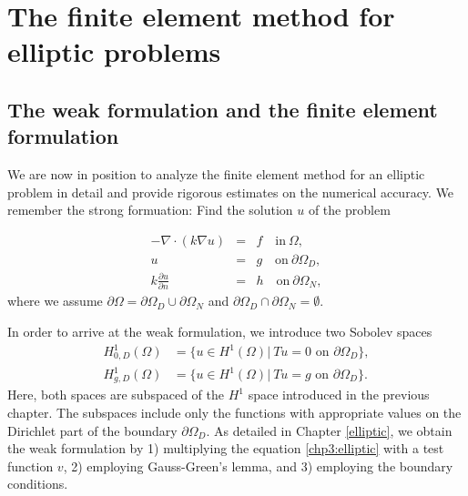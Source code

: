 \chapter{The finite element method for elliptic problems}

\section{The weak formulation and the finite element formulation}

We are now in position to analyze the finite element method
for an elliptic problem in detail and provide rigorous estimates
on the numerical accuracy. We remember the strong formuation:  
Find the solution $u$ of the problem

\begin{eqnarray}
\label{chp3:elliptic}
-\nabla\cdot(k\nabla u)  &=& f \quad \textrm{in}\ \Omega,\\
\label{chp3:Dirichlet}
u&=& g \quad \textrm{on}\ \partial\Omega_D, \\
\label{chp3:Neumann}
k \frac{\partial u}{\partial n}&=& h \quad \textrm{on}\ \partial\Omega_N , 
\end{eqnarray}
where we assume $\partial \Omega = \partial \Omega_D \cup \partial \Omega_N$ 
and $\partial \Omega_D \cap \partial \Omega_N = \emptyset$.

In order to arrive at the weak formulation, we introduce two Sobolev spaces
\begin{align}
H^1_{0, D} (\Omega) &= \{ u \in H^1(\Omega)  | \  T u = 0 \mbox{ on } \partial \Omega_D \}, \\   
H^1_{g, D} (\Omega) &= \{ u \in H^1(\Omega)  | \  T u = g \mbox{ on } \partial \Omega_D \}  .  
\end{align}
Here, both spaces are subspaced of the $H^1$ space introduced in the previous chapter. The 
subspaces include only the functions with appropriate values on the Dirichlet part of the boundary $\partial \Omega_D$.  
As detailed in Chapter \ref{elliptic}, we obtain the weak formulation by 1) multiplying
the equation \eqref{chp3:elliptic} with a test function $v$, 2) employing Gauss-Green's lemma, and 3) employing the 
boundary conditions. 

